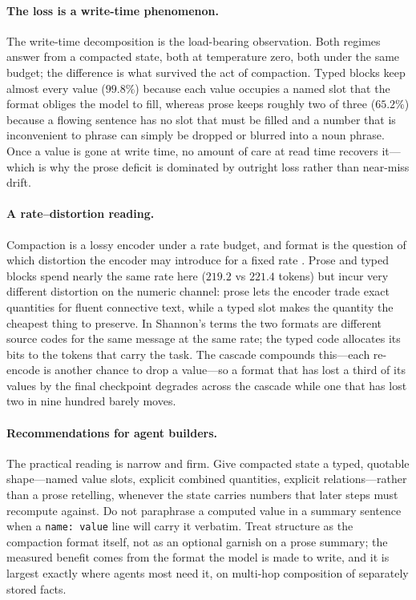 \documentclass[11pt]{article}
\begin{document}
\paragraph{The loss is a write-time phenomenon.}
The write-time decomposition is the load-bearing observation. Both regimes
answer from a compacted state, both at temperature zero, both under the same
budget; the difference is what survived the act of compaction. Typed blocks
keep almost every value ($99.8\%$) because each value occupies a named slot
that the format obliges the model to fill, whereas prose keeps roughly two of
three ($65.2\%$) because a flowing sentence has no slot that must be filled and
a number that is inconvenient to phrase can simply be dropped or blurred into a
noun phrase. Once a value is gone at write time, no amount of care at read time
recovers it---which is why the prose deficit is dominated by outright loss
rather than near-miss drift.

\paragraph{A rate--distortion reading.}
Compaction is a lossy encoder under a rate budget, and format is the question
of which distortion the encoder may introduce for a fixed rate
\citep{colaco2026ratedistortion}. Prose and typed blocks spend nearly the same
rate here ($219.2$ vs $221.4$ tokens) but incur very different distortion on
the numeric channel: prose lets the encoder trade exact quantities for fluent
connective text, while a typed slot makes the quantity the cheapest thing to
preserve. In Shannon's terms the two formats are different source codes for the
same message at the same rate; the typed code allocates its bits to the tokens
that carry the task. The cascade compounds this---each re-encode is another
chance to drop a value---so a format that has lost a third of its values by
the final checkpoint degrades across the cascade while one that has lost two
in nine hundred barely moves.

\paragraph{Recommendations for agent builders.}
The practical reading is narrow and firm. Give compacted state a typed,
quotable shape---named value slots, explicit combined quantities, explicit
relations---rather than a prose retelling, whenever the state carries numbers
that later steps must recompute against. Do not paraphrase a computed value in
a summary sentence when a \texttt{name: value} line will carry it verbatim.
Treat structure as the compaction format itself, not as an optional garnish on
a prose summary; the measured benefit comes from the format the model is made
to write, and it is largest exactly where agents most need it, on multi-hop
composition of separately stored facts.
\end{document}
